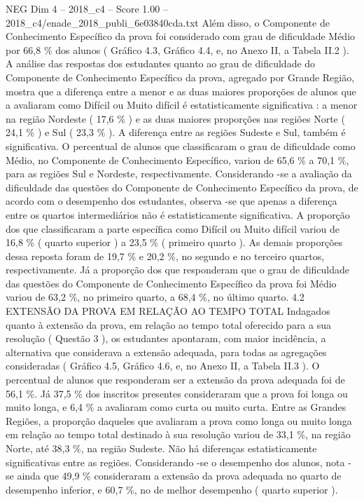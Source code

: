 \begin{textsample}{NEG Dim 4 – 2018\_c4 – Score 1.00 – 2018\_c4/enade\_2018\_publi\_6e03840cda.txt}
Além disso, o Componente de Conhecimento Específico da prova foi considerado com grau de dificuldade Médio por 66,8 \% dos alunos ( Gráfico 4.3, Gráfico 4.4, e, no Anexo II, a Tabela II.2 ).
A análise das respostas dos estudantes quanto ao grau de dificuldade do Componente de Conhecimento Específico da prova, agregado por Grande Região, mostra que a diferença entre a menor e as duas maiores proporções de alunos que a avaliaram como Difícil ou Muito difícil é estatisticamente significativa : a menor na região Nordeste ( 17,6 \% ) e as duas maiores proporções nas regiões Norte ( 24,1 \% ) e Sul ( 23,3 \% ).
A diferença entre as regiões Sudeste e Sul, também é significativa.
O percentual de alunos que classificaram o grau de dificuldade como Médio, no Componente de Conhecimento Específico, variou de 65,6 \% a 70,1 \%, para as regiões Sul e Nordeste, respectivamente.
Considerando -se a avaliação da dificuldade das questões do Componente de Conhecimento Específico da prova, de acordo com o desempenho dos estudantes, observa -se que apenas a diferença entre os quartos intermediários não é estatisticamente significativa.
A proporção dos que classificaram a parte específica como Difícil ou Muito difícil variou de 16,8 \% ( quarto superior ) a 23,5 \% ( primeiro quarto ).
As demais proporções dessa reposta foram de 19,7 \% e 20,2 \%, no segundo e no terceiro quartos, respectivamente.
Já a proporção dos que responderam que o grau de dificuldade das questões do Componente de Conhecimento Específico da prova foi Médio variou de 63,2 \%, no primeiro quarto, a 68,4 \%, no último quarto. 4.2 EXTENSÃO DA PROVA EM RELAÇÃO AO TEMPO TOTAL Indagados quanto à extensão da prova, em relação ao tempo total oferecido para a sua resolução ( Questão 3 ), os estudantes apontaram, com maior incidência, a alternativa que considerava a extensão adequada, para todas as agregações consideradas ( Gráfico 4.5, Gráfico 4.6, e, no Anexo II, a Tabela II.3 ).
O percentual de alunos que responderam ser a extensão da prova adequada foi de 56,1 \%.
Já 37,5 \% dos inscritos presentes consideraram que a prova foi longa ou muito longa, e 6,4 \% a avaliaram como curta ou muito curta.
Entre as Grandes Regiões, a proporção daqueles que avaliaram a prova como longa ou muito longa em relação ao tempo total destinado à sua resolução variou de 33,1 \%, na região Norte, até 38,3 \%, na região Sudeste.
Não há diferenças estatisticamente significativas entre as regiões.
Considerando -se o desempenho dos alunos, nota -se ainda que 49,9 \% consideraram a extensão da prova adequada no quarto de desempenho inferior, e 60,7 \%, no de melhor desempenho ( quarto superior ).

\end{textsample}
